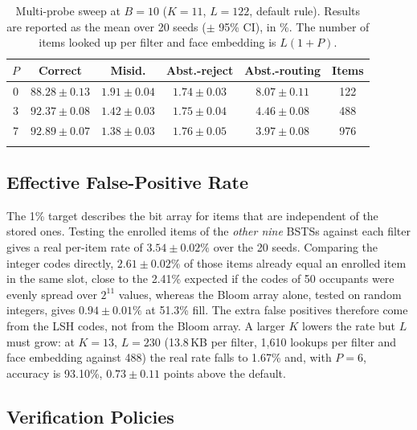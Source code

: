 \documentclass[pdflatex,sn-mathphys-num]{sn-jnl}%
\theoremstyle{thmstyleone}%
\theoremstyle{thmstyletwo}%
\theoremstyle{thmstylethree}%
\begin{document}
\begin{table}[!t]
\caption{Multi-probe sweep at $B=10$ ($K=11$, $L=122$, default rule).
Results are reported as the mean over 20 seeds ($\pm$ 95\% CI), in \%.
The number of items looked up per filter and face embedding is $L(1+P)$.}
\label{tab:probe}

\begin{tabular*}{\textwidth}
{@{\extracolsep\fill}cccccc}
\toprule
$P$
& Correct & Misid. & Abst.-reject & Abst.-routing & Items \\
\midrule

0 & $88.28 \pm 0.13$ & $1.91 \pm 0.04$ & $1.74 \pm 0.03$ & $8.07 \pm 0.11$ & 122 \\

3 & $92.37 \pm 0.08$ & $1.42 \pm 0.03$ & $1.75 \pm 0.04$ & $4.46 \pm 0.08$ & 488 \\

7 & $92.89 \pm 0.07$ & $1.38 \pm 0.03$ & $1.76 \pm 0.05$ & $3.97 \pm 0.08$ & 976 \\
\botrule
\end{tabular*}

\end{table}

\subsection{Effective False-Positive Rate}
\label{sec:fpr}

The 1\% target describes the bit array for items that are independent of the stored ones. Testing the enrolled items of the \emph{other nine} BSTSs against each filter gives a real per-item rate of $3.54 \pm 0.02\%$ over the 20 seeds. Comparing the integer codes directly, $2.61 \pm 0.02\%$ of those items already equal an enrolled item in the same slot, close to the 2.41\% expected if the codes of 50 occupants were evenly spread over $2^{11}$ values, whereas the Bloom array alone, tested on random integers, gives $0.94 \pm 0.01\%$ at 51.3\% fill. The extra false positives therefore come from the LSH codes, not from the Bloom array. A larger $K$ lowers the rate but $L$ must grow: at $K=13$, $L=230$ (13.8\,KB per filter, 1,610 lookups per filter and face embedding against 488) the real rate falls to 1.67\% and, with $P=6$, accuracy is 93.10\%, $0.73 \pm 0.11$ points above the default.

\subsection{Verification Policies}
\label{sec:adaptive}
\end{document}
